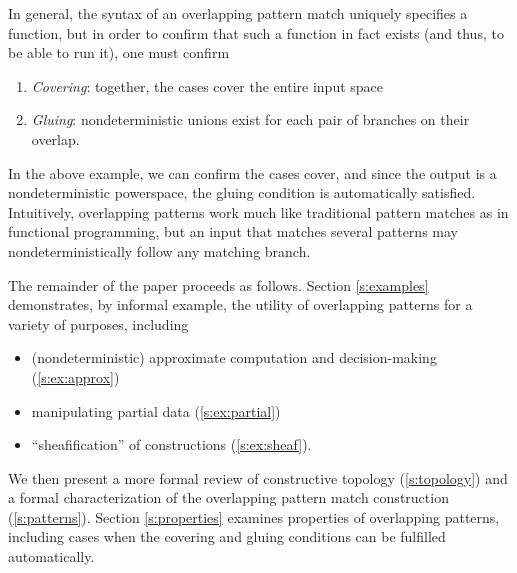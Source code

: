 \documentclass[conference]{IEEEtran}
\newcommand{\R}{\mathbb{R}}
\begin{document}
In general, the syntax of an overlapping pattern match uniquely specifies a function, but in order to confirm that such a function in fact exists (and thus, to be able to run it), one must confirm
\begin{enumerate}
\item \emph{Covering}: together, the cases cover the entire input space
\item \emph{Gluing}: nondeterministic unions exist for each pair of branches on their overlap.
\end{enumerate}
In the above example, we can confirm the cases cover, and since the output is a nondeterministic powerspace, the gluing condition is automatically satisfied. Intuitively, overlapping patterns work much like traditional pattern matches as in functional programming, but an input that matches several patterns may nondeterministically follow any matching branch.


The remainder of the paper proceeds as follows. Section \ref{s:examples} demonstrates, by informal example, the utility of overlapping patterns for a variety of purposes, including
\begin{itemize}
\item (nondeterministic) approximate computation and decision-making (\ref{s:ex:approx})
\item manipulating partial data (\ref{s:ex:partial})
\item ``sheafification'' of constructions (\ref{s:ex:sheaf}).
\end{itemize}

We then present a more formal review of constructive topology (\ref{s:topology}) and a formal characterization of the overlapping pattern match construction (\ref{s:patterns}). Section \ref{s:properties} examines properties of overlapping patterns, including cases when the covering and gluing conditions can be fulfilled automatically. 
\end{document}
